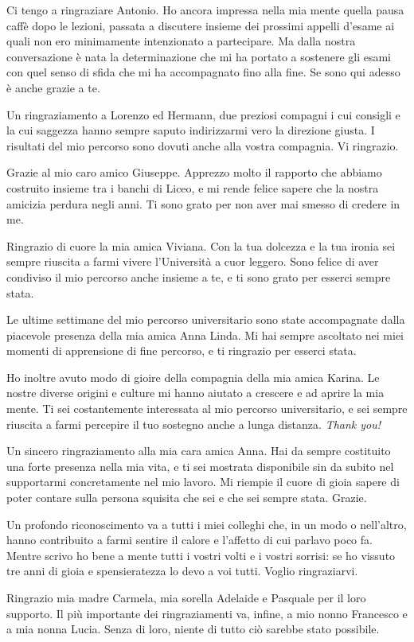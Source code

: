 Ci tengo a ringraziare Antonio. Ho ancora impressa nella mia mente quella pausa caffè dopo le lezioni, passata a discutere insieme dei prossimi appelli d'esame ai quali non ero minimamente intenzionato a partecipare. Ma dalla nostra conversazione è nata la determinazione che mi ha portato a sostenere gli esami con quel senso di sfida che mi ha accompagnato fino alla fine. Se sono qui adesso è anche grazie a te. 

Un ringraziamento a Lorenzo ed Hermann, due preziosi compagni i cui consigli e la cui saggezza hanno sempre saputo indirizzarmi vero la direzione giusta. I risultati del mio percorso sono dovuti anche alla vostra compagnia. Vi ringrazio.

Grazie al mio caro amico Giuseppe. Apprezzo molto il rapporto che abbiamo costruito insieme tra i banchi di Liceo, e mi rende felice sapere che la nostra amicizia perdura negli anni. Ti sono grato per non aver mai smesso di credere in me.

Ringrazio di cuore la mia amica Viviana. Con la tua dolcezza e la tua ironia sei sempre riuscita a farmi vivere l'Università a cuor leggero. Sono felice di aver condiviso il mio percorso anche insieme a te, e ti sono grato per esserci sempre stata.

Le ultime settimane del mio percorso universitario sono state accompagnate dalla piacevole presenza della mia amica Anna Linda. Mi hai sempre ascoltato nei miei momenti di apprensione di fine percorso, e ti ringrazio per esserci stata.

Ho inoltre avuto modo di gioire della compagnia della mia amica Karina. Le nostre diverse origini e culture mi hanno aiutato a crescere e ad aprire la mia mente. Ti sei costantemente interessata al mio percorso universitario, e sei sempre riuscita a farmi percepire il tuo sostegno anche a lunga distanza. \textit{Thank you!}

Un sincero ringraziamento alla mia cara amica Anna. Hai da sempre costituito una forte presenza nella mia vita, e ti sei mostrata disponibile sin da subito nel supportarmi concretamente nel mio lavoro. Mi riempie il cuore di gioia sapere di poter contare sulla persona squisita che sei e che sei sempre stata. Grazie.

Un profondo riconoscimento va a tutti i miei colleghi che, in un modo o nell'altro, hanno contribuito a farmi sentire il calore e l'affetto di cui parlavo poco fa. Mentre scrivo ho bene a mente tutti i vostri volti e i vostri sorrisi: se ho vissuto tre anni di gioia e spensieratezza lo devo a voi tutti. Voglio ringraziarvi.

Ringrazio mia madre Carmela, mia sorella Adelaide e Pasquale per il loro supporto. Il più importante dei ringraziamenti va, infine, a mio nonno Francesco e a mia nonna Lucia. Senza di loro, niente di tutto ciò sarebbe stato possibile. 








